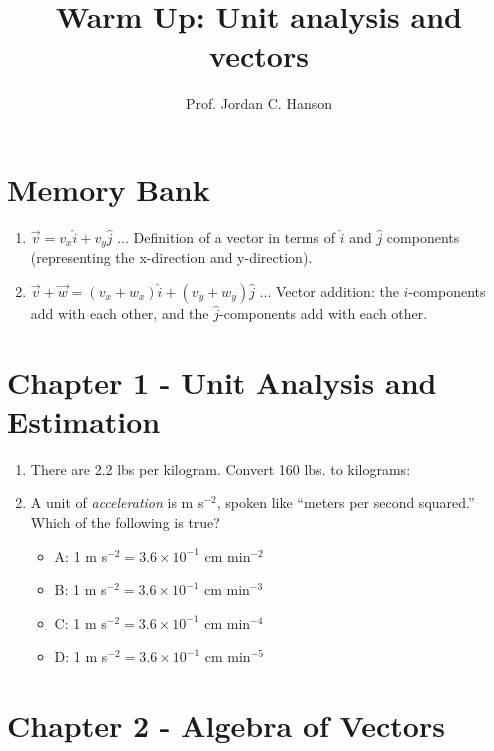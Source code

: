 \documentclass{article}
\begin{document}
\title{Warm Up: Unit analysis and vectors}
\author{Prof. Jordan C. Hanson}

\maketitle

\section{Memory Bank}

\begin{enumerate}
\item $\vec{v} = v_x \hat{i} + v_y \hat{j}$ ... Definition of a vector in terms of $\hat{i}$ and $\hat{j}$ components (representing the x-direction and y-direction).
\item $\vec{v} + \vec{w} = (v_x + w_x) \hat{i} + (v_y + w_y) \hat{j}$ ... Vector addition: the $\hat{i}$-components add with each other, and the $\hat{j}$-components add with each other.
\end{enumerate}

\section{Chapter 1 - Unit Analysis and Estimation}

\begin{enumerate}
\item There are 2.2 lbs per kilogram.  Convert 160 lbs. to kilograms: \\ \vspace{0.5cm}
\item A unit of \textit{acceleration} is m s$^{-2}$, spoken like ``meters per second squared.''  Which of the following is true?
\begin{itemize}
\item A: 1 m s$^{-2} = 3.6 \times 10^{-1}$ cm min$^{-2}$
\item B: 1 m s$^{-2} = 3.6 \times 10^{-1}$ cm min$^{-3}$
\item C: 1 m s$^{-2} = 3.6 \times 10^{-1}$ cm min$^{-4}$
\item D: 1 m s$^{-2} = 3.6 \times 10^{-1}$ cm min$^{-5}$
\end{itemize}
\end{enumerate}

\section{Chapter 2 - Algebra of Vectors}
\end{document}
